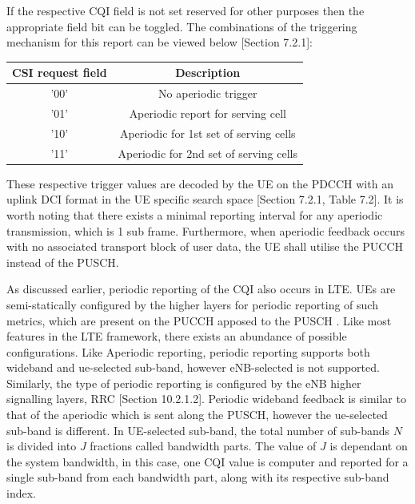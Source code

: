 \documentclass{article}
\begin{document}
If the respective CQI field is not set reserved for other purposes then the appropriate field bit can be toggled. The combinations of the triggering mechanism for this report can be viewed below \cite{ETSITS136213}[Section 7.2.1]: 

\begin{center}
 \begin{tabular}{||c c||} 
 \hline
  CSI request field & Description \\ [0.1ex] 
 \hline\hline
 '00' & No aperiodic trigger  \\ 
 \hline
 '01'  & Aperiodic report for serving cell\\
 \hline
 '10' & Aperiodic for 1st set of serving cells\\ 
 \hline
 '11'  & Aperiodic for 2nd set of serving cells\\
 \hline
\end{tabular}
\end{center}

These respective trigger values are decoded by the UE on the PDCCH with an uplink DCI format in the UE specific search space \cite{ETSITS136213}[Section 7.2.1, Table 7.2].
It is worth noting that there exists a minimal reporting interval for any aperiodic transmission, which is 1 sub frame. Furthermore, when aperiodic feedback occurs with no associated transport block of user data, the UE shall utilise the PUCCH instead of the PUSCH.


As discussed earlier, periodic reporting of the CQI also occurs in LTE. UEs are semi-statically configured by the higher layers for periodic reporting of such metrics, which are present on the PUCCH apposed to the PUSCH \cite[Section 7.2.2]{ETSITS136213}. Like most features in the LTE framework, there exists an abundance of possible configurations. Like Aperiodic reporting, periodic reporting supports both wideband and ue-selected sub-band, however eNB-selected is not supported. Similarly, the type of periodic reporting is configured by the eNB higher signalling layers, RRC \cite{umts_sesia}[Section 10.2.1.2]. Periodic wideband feedback is similar to that of the aperiodic which is sent along the PUSCH, however the ue-selected sub-band is different. In UE-selected sub-band, the total number of sub-bands $N$ is divided into $J$ fractions called bandwidth parts. The value of $J$ is dependant on the system bandwidth, in this case, one CQI value is computer and reported for a single sub-band from each bandwidth part, along with its respective sub-band index.
\end{document}
